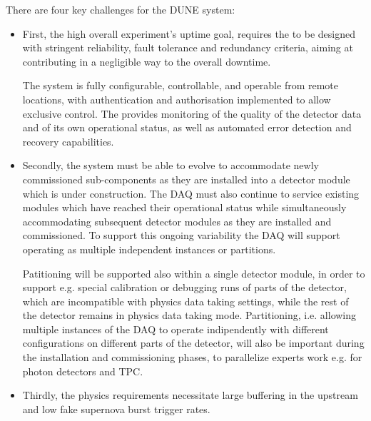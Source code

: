 




There are four key challenges for the DUNE   system: 
\begin{itemize}
\item First, the high overall experiment's uptime goal, requires the  to be designed with stringent reliability, fault tolerance and redundancy criteria, aiming at contributing in a negligible way to the overall downtime.

  The  system is fully configurable, controllable, and operable from remote locations, with authentication and authorisation implemented to allow exclusive control. The  provides monitoring of the quality of the detector data and of its own operational status, as well as automated error detection and recovery capabilities.

\item Secondly, the system must be able to evolve to accommodate newly commissioned sub-components as they are installed into a detector module which is under construction. 
  The DAQ must also continue to service existing modules which have reached their operational status while simultaneously accommodating subsequent detector modules as they are installed and commissioned. 
  To support this ongoing variability the DAQ will support operating as multiple independent instances or partitions.

  Patitioning will be supported also within a single detector module, in order to support e.g. special calibration or debugging runs of parts of the detector, which are incompatible with physics data taking settings, while the rest of the detector remains in physics data taking mode. Partitioning, i.e. allowing multiple instances of the DAQ to operate indipendently with different configurations on different parts of the detector, will also be important during the installation and commissioning phases, to parallelize experts work e.g. for photon detectors and TPC.

\item Thirdly, the   physics
requirements necessitate large buffering in the upstream  and low fake
supernova burst trigger rates. 


\end{itemize}
